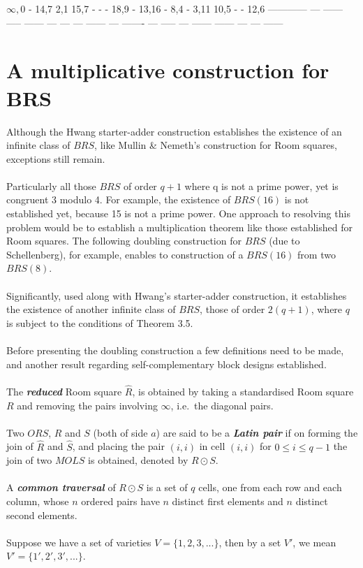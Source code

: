 \documentclass[
  12pt,
  a4paper]{book}
\begin{document}
\(\infty,0\) - 14,7 2,1 15,7 - - - 18,9 - 13,16 - 8,4 - 3,11 10,5 - -
12,6 ------------ --- ------ ----- ------ --- --- --- ------ --- -------
--- ----- --- ------ ------ --- --- ------

\hypertarget{a-multiplicative-construction-for-brs}{%
\section{A multiplicative construction for
BRS}\label{a-multiplicative-construction-for-brs}}

Although the Hwang starter-adder construction establishes the existence
of an infinite class of \(BRS\), like Mullin \& Nemeth's construction
for Room squares, exceptions still remain.\\
~\\
Particularly all those \(BRS\) of order \(q+1\) where q is not a prime
power, yet is congruent 3 modulo 4. For example, the existence of
\(BRS(16)\) is not established yet, because 15 is not a prime power. One
approach to resolving this problem would be to establish a
multiplication theorem like those established for Room squares. The
following doubling construction for \(BRS\) (due to Schellenberg), for
example, enables to construction of a \(BRS(16)\) from two \(BRS(8)\).\\
~\\
Significantly, used along with Hwang's starter-adder construction, it
establishes the existence of another infinite class of \(BRS\), those of
order \(2(q+1)\), where \(q\) is subject to the conditions of Theorem
3.5.\\
~\\
Before presenting the doubling construction a few definitions need to be
made, and another result regarding self-complementary block designs
established.\\
~\\
The \textbf{\emph{reduced}} Room square \(\hat{R}\), is obtained by
taking a standardised Room square \(R\) and removing the pairs involving
\(\infty\), i.e.~the diagonal pairs.\\
~\\
Two \(ORS\), \(R\) and \(S\) (both of side \(a\)) are said to be a
\textbf{\emph{Latin pair}} if on forming the join of \(\hat{R}\) and
\(\hat{S}\), and placing the pair \((i,i)\) in cell \((i,i)\) for
\(0 \leq i \leq q-1\) the join of two \(MOLS\) is obtained, denoted by
\(R \odot S\).\\
~\\
A \textbf{\emph{common traversal}} of \(R \odot S\) is a set of \(q\)
cells, one from each row and each column, whose \(n\) ordered pairs have
\(n\) distinct first elements and \(n\) distinct second elements.\\
~\\
Suppose we have a set of varieties \(V = \{1,2,3,...\}\), then by a set
\(V'\), we mean \(V'=\{1',2',3',...\}\).
\end{document}
